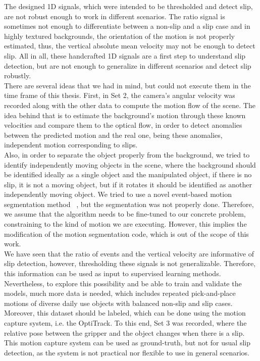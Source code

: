The designed 1D signals, which were intended to be thresholded and detect slip, are not robust enough to work in different scenarios. The ratio signal is sometimes not enough to differentiate between a non-slip and a slip case and in highly textured backgrounds, the orientation of the motion is not properly estimated, thus, the vertical absolute mean velocity may not be enough to detect slip. All in all, these handcrafted 1D signals are a first step to understand slip detection, but are not enough to generalize in different scenarios and detect slip robustly.\\

There are several ideas that we had in mind, but could not execute them in the time frame of this thesis. First, in Set 2, the camera's angular velocity was recorded along with the other data to compute the motion flow of the scene. The idea behind that is to estimate the background's motion through these known velocities and compare them to the optical flow, in order to detect anomalies between the predicted motion and the real one, being these anomalies, independent motion corresponding to slips.\\

Also, in order to separate the object properly from the background, we tried to identify independently moving objects in the scene, where the background should be identified ideally as a single object and the manipulated object, if there is no slip, it is not a moving object, but if it rotates it should be identified as another independently moving object. We tried to use a novel event-based motion segmentation method ~\cite{motionsegmentation}, but the segmentation was not properly done. Therefore, we assume that the algorithm needs to be fine-tuned to our concrete problem, constraining to the kind of motion we are executing. However, this implies the modification of the motion segmentation code, which is out of the scope of this work.\\

We have seen that the ratio of events and the vertical velocity are informative of slip detection, however, thresholding these signals is not generalizable. Therefore, this information can be used as input to supervised learning methods. Nevertheless, to explore this possibility and be able to train and validate the models, much more data is needed, which includes repeated pick-and-place motions of diverse daily use objects with balanced non-slip and slip cases. Moreover, this dataset should be labeled, which can be done using the motion capture system, i.e. the OptiTrack. To this end, Set 3 was recorded, where the relative pose between the gripper and the object changes when there is a slip. This motion capture system can be used as ground-truth, but not for usual slip detection, as the system is not practical nor flexible to use in general scenarios.\\

